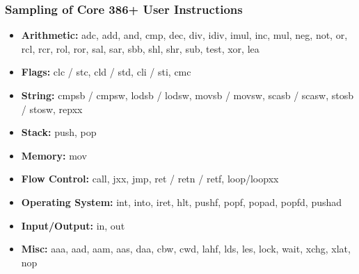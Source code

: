 \documentclass[11pt,xcolor=dvipsnames]{beamer}
\begin{document}
\begin{frame}[fragile,t]
\frametitle{Sampling of Core 386+ User Instructions}
\begin{itemize}
    \item {\bf Arithmetic:} {\ttfamily adc, add, and, cmp, dec, div, idiv, imul, inc, mul, neg, not, or, rcl, rcr, rol, ror, sal, sar, sbb, shl, shr, sub, test, xor, lea}
    \item {\bf Flags:} {\ttfamily clc / stc, cld / std, cli / sti, cmc}
    \item {\bf String:} {\ttfamily cmpsb / cmpsw, lodsb / lodsw, movsb / movsw, scasb / scasw, stosb / stosw, repxx}
    \item {\bf Stack:} {\ttfamily push, pop}
    \item {\bf Memory:} {\ttfamily mov}
    \item {\bf Flow Control:} {\ttfamily call, jxx, jmp, ret / retn / retf, loop/loopxx}
    \item {\bf Operating System:} {\ttfamily int, into, iret, hlt, pushf, popf, popad, popfd, pushad}
    \item {\bf Input/Output:} {\ttfamily in, out}
    \item {\bf Misc:} {\ttfamily aaa, aad, aam, aas, daa, cbw, cwd, lahf, lds, les, lock, wait, xchg, xlat, nop}
\end{itemize}
\end{frame}
\end{document}
